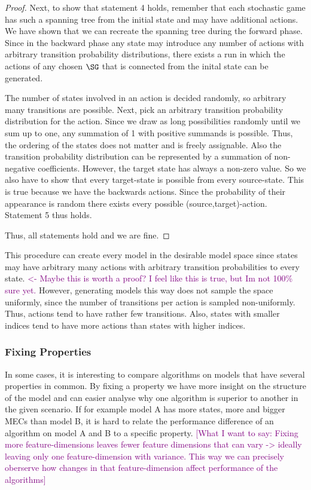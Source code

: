 \begin{proof}
Next, to show that statement 4 holds, remember that each stochastic game has such a spanning tree from the initial state and may have additional actions. We have shown that we can recreate the
spanning tree during the forward phase. Since in the backward phase any state may introduce any number of actions with arbitrary transition probability distributions, there exists a run in which the actions
of any chosen $\SG$ that is connected from the inital state can be generated.

The number of states involved in an action is decided randomly, so arbitrary many transitions are possible. Next, pick an arbitrary transition probability distribution for the action. Since we draw as long possibilities randomly until we sum up to one, any summation of 1 with positive summands is possible. Thus, the ordering of the states does not matter and is freely assignable. Also the transition probability distribution can be represented by a summation of non-negative coefficients.
However, the target state has always a non-zero value. So we also have to show that every target-state is possible from every source-state. This is true because we have the backwards actions. Since the probability of their appearance is random there exists every possible (source,target)-action.
Statement 5 thus holds.

Thus, all statements hold and we are fine.
\end{proof}

This procedure can create every model in the desirable model space since states may have arbitrary many actions with arbitrary transition probabilities to every state. \textcolor{purple}{ <- Maybe this is worth a proof? I feel like this is true, but Im not 100\% sure yet.} However, generating models this way does not sample the space uniformly, since the number of transitions per action is sampled non-uniformly. Thus, actions tend to have rather few transitions. Also, states with smaller indices tend to have more actions than states with higher indices.

\subsubsection{Fixing Properties}
In some cases, it is interesting to compare algorithms on models that have several properties in common. By fixing a property we have more insight on the structure of the model and can easier analyse why one algorithm is superior to another in the given scenario. If for example model A has more states, more and bigger MECs than model B, it is hard to relate the performance difference of an algorithm on model A and B to a specific property. \textcolor{purple}{[What I want to say: Fixing more feature-dimensions leaves fewer feature dimensions that can vary -> ideally leaving only one feature-dimension with variance. This way we can precisely oberserve how changes in that feature-dimension affect performance of the algorithms]} 

